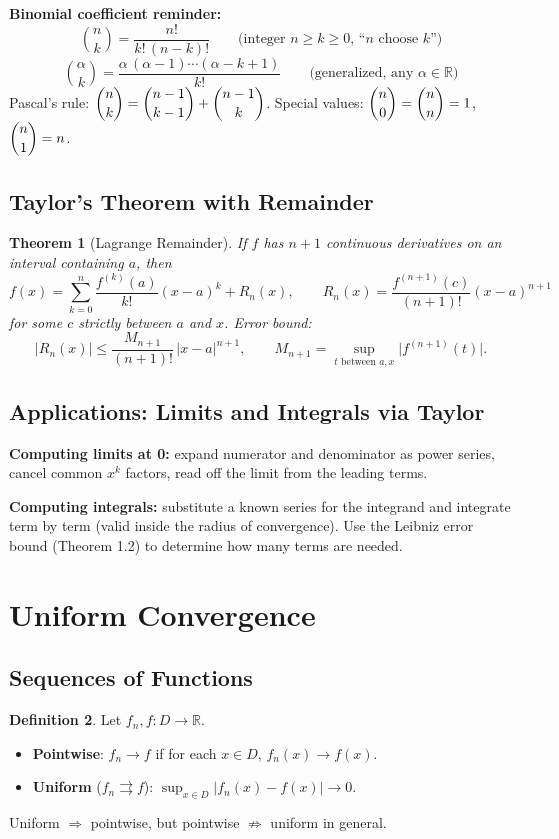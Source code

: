 \documentclass[12pt, a4paper]{article}
\newtheorem{theorem}{Theorem}[section]
\theoremstyle{definition}
\newtheorem{definition}[theorem]{Definition}
\theoremstyle{remark}
\begin{document}
\textbf{Binomial coefficient reminder:}
\[
  \binom{n}{k} = \frac{n!}{k!\,(n-k)!}
  \qquad \text{(integer }n \ge k \ge 0\text{, ``}n\text{ choose }k\text{'')}
\]
\[
  \binom{\alpha}{k} = \frac{\alpha\,(\alpha-1)\cdots(\alpha-k+1)}{k!}
  \qquad \text{(generalized, any }\alpha \in \mathbb{R}\text{)}
\]
Pascal's rule: $\dbinom{n}{k} = \dbinom{n-1}{k-1} + \dbinom{n-1}{k}$.\quad
Special values: $\dbinom{n}{0} = \dbinom{n}{n} = 1$, $\dbinom{n}{1} = n$.

\subsection{Taylor's Theorem with Remainder}

\begin{theorem}[Lagrange Remainder]
If $f$ has $n+1$ continuous derivatives on an interval containing $a$, then
\[
  f(x) = \sum_{k=0}^n \frac{f^{(k)}(a)}{k!}(x-a)^k + R_n(x),
  \qquad
  R_n(x) = \frac{f^{(n+1)}(c)}{(n+1)!}(x-a)^{n+1}
\]
for some $c$ strictly between $a$ and $x$.  Error bound:
\[
  |R_n(x)| \leq \frac{M_{n+1}}{(n+1)!}\,|x-a|^{n+1},
  \qquad M_{n+1} = \sup_{t \text{ between } a,x}\bigl|f^{(n+1)}(t)\bigr|.
\]
\end{theorem}

\subsection{Applications: Limits and Integrals via Taylor}

\textbf{Computing limits at 0:} expand numerator and denominator as power series, cancel common $x^k$ factors, read off the limit from the leading terms.

\textbf{Computing integrals:} substitute a known series for the integrand and integrate term by term (valid inside the radius of convergence). Use the Leibniz error bound (Theorem 1.2) to determine how many terms are needed.

\section{Uniform Convergence}

\subsection{Sequences of Functions}

\begin{definition}
Let $f_n, f : D \to \mathbb{R}$.
\begin{itemize}
  \item \textbf{Pointwise}: $f_n \to f$ if for each $x \in D$, $f_n(x) \to f(x)$.
  \item \textbf{Uniform} ($f_n \rightrightarrows f$): $\displaystyle\sup_{x \in D}|f_n(x) - f(x)| \to 0$.
\end{itemize}
Uniform $\Rightarrow$ pointwise, but pointwise $\not\Rightarrow$ uniform in general.
\end{definition}
\end{document}
